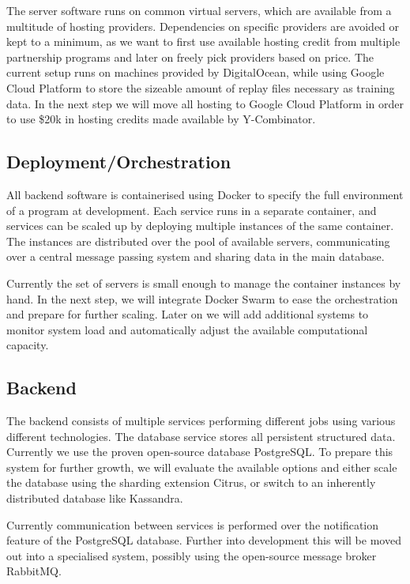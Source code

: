 \documentclass[12pt]{article} %
\begin{document}
The server software runs on common virtual servers, which are available from a multitude of hosting providers. Dependencies on specific providers are avoided or kept to a minimum, as we want to first use available hosting credit from multiple partnership programs and later on freely pick providers based on price. The current setup runs on machines provided by DigitalOcean, while using Google Cloud Platform to store the sizeable amount of replay files necessary as training data. In the next step we will move all hosting to Google Cloud Platform in order to use \$20k in hosting credits made available by Y-Combinator. 

\subsection{Deployment/Orchestration}

All backend software is containerised using Docker to specify the full environment of a program at development. Each service runs in a separate container, and services can be scaled up by deploying multiple instances of the same container. The instances are distributed over the pool of available servers, communicating over a central message passing system and sharing data in the main database.

Currently the set of servers is small enough to manage the container instances by hand. In the next step, we will integrate Docker Swarm to ease the orchestration and prepare for further scaling. Later on we will add additional systems to monitor system load and automatically adjust the available computational capacity.

\subsection{Backend}

The backend consists of multiple services performing different jobs using various different technologies. The database service stores all persistent structured data. Currently we use the proven open-source database PostgreSQL. To prepare this system for further growth, we will evaluate the available options and either scale the database using the sharding extension Citrus, or switch to an inherently distributed database like Kassandra.

Currently communication between services is performed over the notification feature of the PostgreSQL database. Further into development this will be moved out into a specialised system, possibly using the open-source message broker RabbitMQ.
\end{document}
